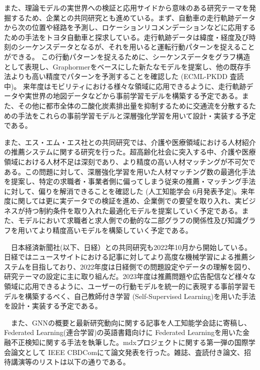 また、理論モデルの実世界への検証と応用サイドから意味のある研究テーマを発掘するため、企業との共同研究とも進めている。まず、自動車の走行軌跡データから次の位置や経路を予測し、ロケーションリコメンデーションなどに応用するための手法をトヨタ自動車と探求している。走行軌跡データは緯度・経度及び時刻のシーケンスデータとなるが、それを用いると運転行動パターンを捉えることができる。
この行動パターンを捉えるために、シーケンスデータをグラフ構造として表現し、Graphormerをベースにした新たなモデルを提案し、他の既存手法よりも高い精度でパターンを予測することを確認した (ECML-PKDD \cite{stgtrans} 査読中)。
来年度はモビリティにおける様々な領域に応用できるように、走行軌跡データや実世界の地図データなどから事前学習モデルを構築する予定である。また、その他に都市全体の二酸化炭素排出量を抑制するために交通流を分散するための手法をこれらの事前学習モデルと深層強化学習を用いて設計・実装する予定である。

また、エス・エム・エス社との共同研究では、介護や医療領域における人材紹介の推薦システムに関する研究を行った。超高齢化社会に突入する中、介護や医療領域における人材不足は深刻であり、より精度の高い人材マッチングが不可欠である。この問題に対して、深層強化学習を用いた人材マッチング数の最適化手法を提案し、特定の求職者・事業者側に偏ってしまう従来の推薦・マッチング手法に対して、偏りを解消できることを確認した (人工知能学会\cite{sms} 6月発表予定)。来年度に関しては更に実データでの検証を進め、企業側での要望を取り入れ、実ビジネスが持つ制約条件を取り入れた最適化モデルを提案していく予定である。また、モデルにおいて求職者と求人側での動的な二部グラフの関係性及び知識グラフを用いてより精度高いモデルを構築していく予定である。

　日本経済新聞社(以下、日経）との共同研究も2022年10月から開始している。日経ではニュースサイトにおける記事に対してより高度な機械学習による推薦システムを目指しており、2022年度は日経側での問題設定やデータの理解を図り、研究テーマの設定に主に取り組んだ。2023年度は推薦問題や広告配信など様々な領域に応用できるように、ユーザーの行動モデルを統一的に表現する事前学習モデルを構築するべく、自己教師付き学習 (Self-Supervised Learning)を用いた手法を設計・実装する予定である。

　また、GNNの概要と最新研究動向に関する記事を人工知能学会誌\cite{jsai-gnn}に寄稿し、Federated Learning(連合学習)の英語書籍向けに Federated Learningを用いた金融不正検知に関する手法を執筆した\cite{fl-book}。mdxプロジェクトに関する第一弾の国際学会論文として IEEE CBDCom\cite{mdx}にて論文発表を行った。雑誌、査読付き論文、招待講演等のリストは以下の通りである。


